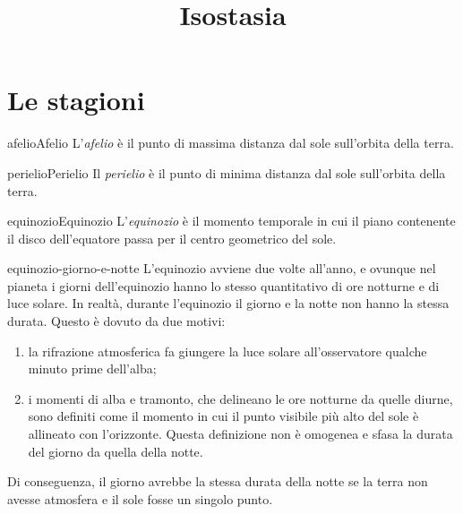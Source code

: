 \documentclass[preview]{standalone}
\begin{document}
\title{Isostasia}
\genpage

\section{Le stagioni}


\begin{snippetdefinition}{afelio}{Afelio}
    L'\textit{afelio} è il punto di massima distanza dal sole sull'orbita
    della terra.
\end{snippetdefinition}

\begin{snippetdefinition}{perielio}{Perielio}
    Il \textit{perielio} è il punto di minima distanza dal sole sull'orbita
    della terra.
\end{snippetdefinition}


\begin{snippetdefinition}{equinozio}{Equinozio}
    L'\textit{equinozio} è il momento temporale in
    cui il piano contenente il disco dell'equatore
    passa per il centro geometrico del sole.
\end{snippetdefinition}

\begin{snippet}{equinozio-giorno-e-notte}
    L'equinozio avviene due volte all'anno, e ovunque nel pianeta i giorni dell'equinozio hanno lo stesso quantitativo di ore notturne e di luce solare.
    In realtà, durante l'equinozio il giorno e la notte non hanno la stessa durata.
    Questo è dovuto da due motivi:
    \begin{enumerate}
        \item la rifrazione atmosferica fa giungere la luce solare all'osservatore qualche minuto prime dell'alba;
        \item i momenti di alba e tramonto, che delineano le ore notturne da quelle diurne, sono definiti come il momento in cui il punto visibile più alto del sole è allineato con l'orizzonte. Questa definizione non è omogenea e sfasa la durata del giorno da quella della notte.
    \end{enumerate}
    Di conseguenza, il giorno avrebbe la stessa durata della notte se la terra non avesse atmosfera e il sole fosse un singolo punto.
\end{snippet}
\end{document}
